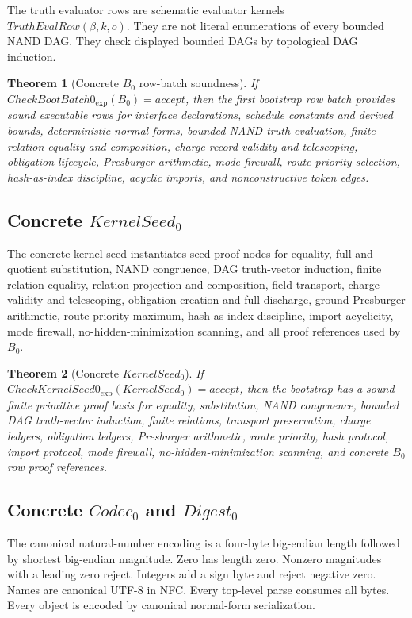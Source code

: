 \documentclass[10.5pt,a4paper]{article}
\newtheorem{theorem}{Theorem}[section]
\begin{document}
The truth evaluator rows are schematic evaluator kernels \(TruthEvalRow(\beta,k,o)\). They are not literal enumerations of every bounded NAND DAG. They check displayed bounded DAGs by topological DAG induction.

\begin{theorem}[Concrete \(B_0\) row-batch soundness]
If \(CheckBootBatch0_{\exp}(B_0)=accept\), then the first bootstrap row batch provides sound executable rows for interface declarations, schedule constants and derived bounds, deterministic normal forms, bounded NAND truth evaluation, finite relation equality and composition, charge record validity and telescoping, obligation lifecycle, Presburger arithmetic, mode firewall, route-priority selection, hash-as-index discipline, acyclic imports, and nonconstructive token edges.
\end{theorem}

\subsection{Concrete \(KernelSeed_0\)}
The concrete kernel seed instantiates seed proof nodes for equality, full and quotient substitution, NAND congruence, DAG truth-vector induction, finite relation equality, relation projection and composition, field transport, charge validity and telescoping, obligation creation and full discharge, ground Presburger arithmetic, route-priority maximum, hash-as-index discipline, import acyclicity, mode firewall, no-hidden-minimization scanning, and all proof references used by \(B_0\).

\begin{theorem}[Concrete \(KernelSeed_0\)]
If \(CheckKernelSeed0_{\exp}(KernelSeed_0)=accept\), then the bootstrap has a sound finite primitive proof basis for equality, substitution, NAND congruence, bounded DAG truth-vector induction, finite relations, transport preservation, charge ledgers, obligation ledgers, Presburger arithmetic, route priority, hash protocol, import protocol, mode firewall, no-hidden-minimization scanning, and concrete \(B_0\) row proof references.
\end{theorem}

\subsection{Concrete \(Codec_0\) and \(Digest_0\)}
The canonical natural-number encoding is a four-byte big-endian length followed by shortest big-endian magnitude. Zero has length zero. Nonzero magnitudes with a leading zero reject. Integers add a sign byte and reject negative zero. Names are canonical UTF-8 in NFC. Every top-level parse consumes all bytes. Every object is encoded by canonical normal-form serialization.
\end{document}
